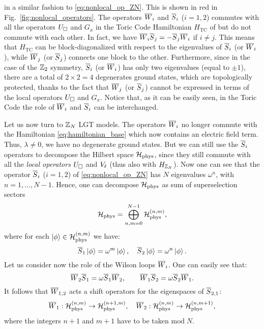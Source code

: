 in a similar fashion to \eqref{eq:nonlocal_op_ZN}.
This is shown in red in Fig.~\ref{fig:nonlocal_operators}.
The operators $\overline{W}_i$ and $\overline{S}_i$ ($i=1,2$) commutes with all the operators $U_{\square}$ and $G_x$ in the Toric Code Hamiltonian $H_{\text{TC}}$ of
but do not commute with each other.
In fact, we have $\overline{W}_i \overline{S}_j = - \overline{S}_j \overline{W}_i$ if $i \neq j$.
This means that $H_{\text{TC}}$ can be block-diagonalized with respect to the eigenvalues of $\overline{S}_i$ (or $\overline{W}_i$), while $\overline{W}_j$ (or $\overline{S}_j$) connects one block to the other.
Furthermore, since in the case of the  $\mathbb{Z}_2$ symmetry,
$\overline{S}_i$ (or $\overline{W}_i$) has only two eigenvalues (equal to $\pm 1$), there are a total of $2 \times 2 = 4$ degenerates ground states, which are topologically protected, thanks to the fact
that $\overline{W}_j$ (or $\overline{S}_j$) cannot be expressed in terms of the local operators $U_{\square}$ and $G_x$.
Notice that, as it can be easily seen, in the Toric Code the role of $\overline{W}_i$ and $\overline{S}_i$ can be interchanged.

Let us now turn to $\mathbb{Z}_N$ LGT models.
The operators $\overline{W}_i$ no longer commute with the Hamiltonian \eqref{eq:hamiltonian_base} which now contains an electric field term.
Thus, $\lambda \neq 0$, we have no degenerate ground states.
But we can still use the $\overline{S}_i$ operators to decompose the Hilbert space $\mathcal{H}_{\text{phys}}$, since they still commute with all the \emph{local operators} $U_{\square}$ and $V_{\ell}$ (thus also with $H_{\mathbb{Z}_N}$).
Now one can see that the operator $\overline{S}_i$ ($i=1,2$) of \eqref{eq:nonlocal_op_ZN} has $N$ eigenvalues $\omega^n$, with $n=1, \dots, N-1$.
Hence, one can decompose $\mathcal{H}_{\text{phys}}$ as sum of superselection sectors
\begin{equation}
    \mathcal{H}_{\text{phys}} = \bigoplus_{n, m=0}^{N-1} \mathcal{H}_{\text{phys}}^{(n, m)},
    \label{eq:decomposizione_Hphys}
\end{equation}
where for each $\ket{\phi} \in \mathcal{H}_{\text{phys}}^{(n, m)}$ we have:
\begin{equation}
    \overline{S}_1 \ket{\phi} = \omega^{m}\ket{\phi}, \quad
    \overline{S}_2 \ket{\phi} = \omega^{n}\ket{\phi}.
\end{equation}
Let us consider now the role of the Wilson loops $\overline{W}_i$.
One can easily see that:
\begin{equation}
    \overline{W}_2 \overline{S}_1 = \omega \overline{S}_1 \overline{W}_2, \qquad
    \overline{W}_1 \overline{S}_2 = \omega \overline{S}_2 \overline{W}_1.
    \label{eq:algebra_op_nonlocali}
\end{equation}
It follows that $\overline{W}_{1,2}$ acts a shift operators for the eigenspaces of $\overline{S}_{2,1}$:
\begin{equation}
    \overline{W}_1 : \mathcal{H}_{\text{phys}}^{(n, m)} \to \mathcal{H}_{\text{phys}}^{(n + 1, m)}, \quad
    \overline{W}_2 : \mathcal{H}_{\text{phys}}^{(n, m)} \to \mathcal{H}_{\text{phys}}^{(n, m + 1)},
    \label{eq:azione_wilson_loop}
\end{equation}
where the integers $n + 1$ and $m + 1$ have to be taken $\mathrm{mod}\; N$.

